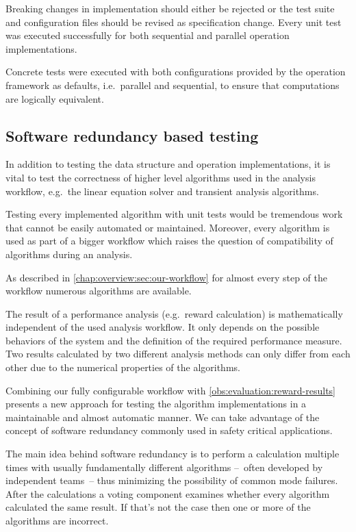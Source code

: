 Breaking changes in implementation should either be rejected or the
test suite and configuration files should be revised as specification
change. Every unit test was executed successfully for both sequential
and parallel operation implementations.

Concrete tests were executed with both configurations provided by the
operation framework as defaults, i.e.~parallel and sequential, to
ensure that computations are logically equivalent.

\subsection{Software redundancy based testing}

In addition to testing the data structure and operation
implementations, it is vital to test the correctness of higher level
algorithms used in the analysis workflow, e.g.\ the linear equation
solver and transient analysis algorithms.

Testing every implemented algorithm with unit tests would be
tremendous work that cannot be easily automated or maintained.
Moreover, every algorithm is used as part of a bigger workflow which
raises the question of compatibility of algorithms during an analysis.

As described in \cref{chap:overview:sec:our-workflow} for almost every
step of the workflow numerous algorithms are available.

\begin{obs}
  \label{obs:evaluation:reward-results}
  The result of a performance analysis (e.g.\ reward calculation) is
  mathematically independent of the used analysis workflow. It only
  depends on the possible behaviors of the system and the definition
  of the required performance measure. Two results calculated by two
  different analysis methods can only differ from each other due to the
  numerical properties of the algorithms.
\end{obs}  

Combining our fully configurable workflow with
\cref{obs:evaluation:reward-results} presents a new approach for
testing the algorithm implementations in a maintainable and almost
automatic manner. We can take advantage of the concept of software
redundancy commonly used in safety critical applications.

The main idea behind software redundancy is to perform a calculation
multiple times with usually fundamentally different algorithms
--~often developed by independent teams~-- thus minimizing the
possibility of common mode failures. After the calculations a voting
component examines whether every algorithm calculated the same
result. If that's not the case then one or more of the algorithms are
incorrect.

